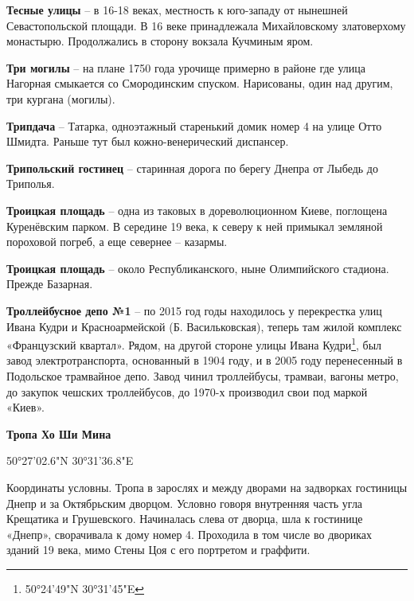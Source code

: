 \medskip

\textbf{Тесные улицы} – в 16-18 веках, местность к юго-западу от нынешней Севастопольской площади. В 16 веке принадлежала Михайловскому златоверхому монастырю. Продолжались в сторону вокзала Кучминым яром.\\

\medskip

\textbf{Три могилы} – на плане 1750 года урочище примерно в районе где улица Нагорная смыкается со Смородинским спуском. Нарисованы, один над другим, три кургана (могилы).\\

\medskip


\textbf{Трипдача} – Татарка, одноэтажный старенький домик номер 4 на улице Отто Шмидта. Раньше тут был кожно-венерический диспансер.\\


\medskip

\textbf{Трипольский гостинец} – старинная дорога по берегу Днепра от Лыбедь до Триполья.\\


\medskip

\textbf{Троицкая площадь} – одна из таковых в дореволюционном Киеве, поглощена Куренёвским парком. В середине 19 века, к северу к ней примыкал земляной пороховой погреб, а еще севернее – казармы.\\

\medskip

\textbf{Троицкая площадь} – около Республиканского, ныне Олимпийского стадиона. Прежде Базарная.\\

\medskip

\textbf{Троллейбусное депо №1} – по 2015 год годы находилось у перекрестка улиц Ивана Кудри и Красноармейской (Б. Васильковская), теперь там жилой комплекс «Французский квартал». Рядом, на другой стороне улицы Ивана Кудри\footnote{50°24'49"N 30°31'45"E}, был завод электротранспорта, основанный в 1904 году, и в 2005 году перенесенный в Подольское трамвайное депо. Завод чинил троллейбусы, трамваи, вагоны метро, до закупок чешских троллейбусов, до 1970-х производил свои под маркой «Киев».\\


\medskip

\textbf{Тропа Хо Ши Мина}

50°27'02.6"N 30°31'36.8"E

Координаты условны. Тропа в зарослях и между дворами на задворках гостиницы Днепр и за Октябрьским дворцом. Условно говоря внутренняя часть угла Крещатика и Грушевского. Начиналась слева от дворца, шла к гостинице «Днепр», сворачивала к дому номер 4. Проходила в том числе во двориках зданий 19 века, мимо Стены Цоя с его портретом и граффити.

